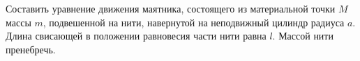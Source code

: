 Составить уравнение движения маятника, состоящего из материальной точки $M$ массы $m$,
подвешенной на нити, навернутой на неподвижный цилиндр радиуса $a$.
Длина свисающей в положении равновесия части нити равна $l$.
Массой нити пренебречь.
